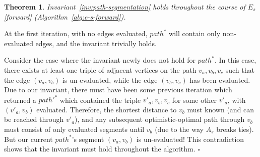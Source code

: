 \documentclass{report}
\newtheorem{theorem}{Theorem}
\newenvironment{proof}[1][Proof]{\begin{trivlist}
   \item[\hskip \labelsep {\bfseries #1}]}{\hfill$\square$\end{trivlist}}
\begin{document}
\begin{theorem}
Invariant~\ref{inv:path-segmentation} holds throughout the course of
$E_s$ [forward] (Algorithm~\ref{alg:e-s-forward}).
\label{thm:seg-fwd}
\end{theorem}

\begin{proof}
At the first iteration, with no edges evaluated,
$path^*$ will contain only non-evaluated edges,
and the invariant trivially holds.

Consider the case where the invariant newly does not hold for $path^*$.
In this case, there exists at least one triple of adjacent vertices
on the path $v_a, v_b, v_c$
such that the edge $(v_a, v_b)$ is un-evaluated,
while the edge $(v_b, v_c)$ has been evaluated.
Due to our invariant,
there must have been some previous iteration which returned a
$path'^*$ which contained the triple
$v'_a, v_b, v_c$ for some other $v'_a$,
with $(v'_a, v_b)$ evaluated.
Therefore, the shortest distance to $v_b$ must known (and can be
reached through $v'_a$),
and any subsequent optimistic-optimal path through $v_b$
must consist of only evaluated segments until $v_b$
(due to the way $A_s$ breaks ties).
But our current $path^*$'s segment $(v_a, v_b)$ is un-evaluated!
This contradiction shows that the invariant must hold throughout the
algorithm.
\end{proof}
\end{document}
